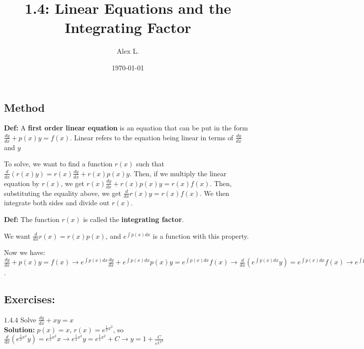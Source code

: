 \documentclass{article}
\title{1.4: Linear Equations and the Integrating Factor}
\author{Alex L.}
\date{\today}
\begin{document}
\maketitle

\subsection{Method}

\textbf{Def:} A \textbf{first order linear equation} is an equation that can be put in the form $\frac{dy}{dx} + p(x)y = f(x)$. Linear refers to the equation being linear in terms of $\frac{dy}{dx}$ and $y$

To solve, we want to find a function $r(x)$ such that $\frac{d}{dx}(r(x)y) = r(x)\frac{dy}{dx} + r(x)p(x)y$. Then, if we multiply the linear equation by $r(x)$, we get $r(x)\frac{dy}{dx} + r(x)p(x)y = r(x)f(x)$. Then, substituting the equality above, we get $\frac{d}{dx} r(x)y = r(x)f(x)$. We then integrate both sides and divide out $r(x)$. 

\textbf{Def:} The function $r(x)$ is called the \textbf{integrating factor}.

We want $\frac{d}{dx} r(x) = r(x)p(x)$, and $e^{\int p(x) dx}$ is a function with this property.

Now we have: $\frac{dy}{dx} + p(x)y = f(x) \rightarrow e^{\int p(x)dx}\frac{dy}{dx} + e^{\int p(x) dx}p(x)y = e^{\int p(x)dx}f(x) \rightarrow \frac{d}{dx}(e^{\int p(x) dx} y) = e^{\int p(x) dx} f(x) \rightarrow e^{\int p(x) dx}y = \int(e^{\int p(x) dx}f(x)) dx + C \rightarrow y = e^{-\int p(x) dx}(\int e^{\int p(x)dx}f(x)dx + C)$.

\subsection{Exercises:}

$1.4.4$ Solve $\frac{dy}{dx} + xy = x$ \\ \textbf{Solution:} $p(x) = x$, $r(x) = e^{\frac{1}{2} x^2}$, so $\frac{d}{dx}(e^{\frac{1}{2}x^2}y) = e^{\frac{1}{2}x^2}x \rightarrow e^{\frac{1}{2}x^2}y = e^{\frac{1}{2}x^2} + C \rightarrow y = 1+\frac{C}{e^{\frac{1}{2}x^2}}$
\end{document}
